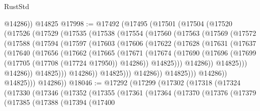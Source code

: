 \begin{lexlean}{RustStd}
\begin{coremodule}
        @14286))
    @14825
@17998 := @17492
    (@17495
      (@17501
        (@17504
          (@17520
            (@17526
              (@17529
                (@17535
                  (@17538
                    (@17554
                      (@17560
                        (@17563
                          (@17569
                            (@17572
                              (@17588
                                (@17594
                                  (@17597
                                    (@17603
                                      (@17606
                                        (@17622
                                          (@17628
                                            (@17631
                                              (@17637
                                                (@17640
                                                  (@17656
                                                    (@17662
                                                      (@17665
                                                        (@17671
                                                          (@17674
                                                            (@17690
                                                              (@17696
                                                                (@17699
                                                                  (@17705
                                                                    (@17708 (@17724 @17950))
                                                                    @14286))
                                                                @14825)))
                                                          @14286))
                                                      @14825)))
                                                @14286))
                                            @14825)))
                                      @14286))
                                  @14825)))
                            @14286))
                        @14825)))
                  @14286))
              @14825)))
        @14286))
@18046 := @17292
    (@17299
      (@17302
        (@17318
          (@17324
            (@17330
              (@17346
                (@17352
                  (@17355
                    (@17361
                      (@17364
                        (@17370
                          (@17376
                            (@17379
                              (@17385
                                (@17388
                                  (@17394
                                    (@17400

\end{coremodule}
\end{lexlean}
